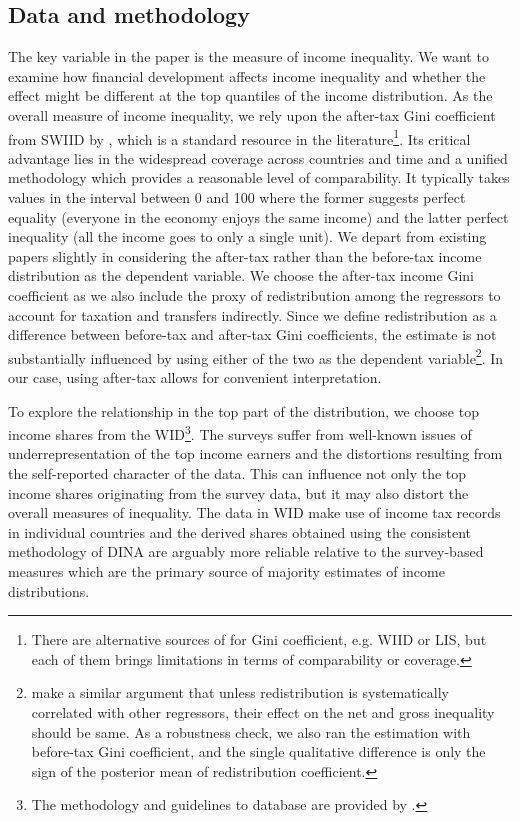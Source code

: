 \begin{refsection}
\section{Data and methodology}\label{ch4sec:datameth}
The key variable in the paper is the measure of income inequality. We want to examine how financial development affects income inequality and whether the effect might be different at the top quantiles of the income distribution. As the overall measure of income inequality, we rely upon the after-tax Gini coefficient from \ac{SWIID} by \textcite{Solt2019}, which is a standard resource in the literature\footnote{There are alternative sources of for Gini coefficient, e.g. \ac{WIID} or \ac{LIS}, but each of them brings limitations in terms of comparability or coverage.}. Its critical advantage lies in the widespread coverage across countries and time and a unified methodology which provides a reasonable level of comparability. It typically takes values in the interval between 0 and 100 where the former suggests perfect equality (everyone in the economy enjoys the same income) and the latter perfect inequality (all the income goes to only a single unit). We depart from existing papers slightly in considering the after-tax rather than the before-tax income distribution as the dependent variable. We choose the after-tax income Gini coefficient as we also include the proxy of redistribution among the regressors to account for taxation and transfers indirectly. Since we define redistribution as a difference between before-tax and after-tax Gini coefficients, the estimate is not substantially influenced by using either of the two as the dependent variable\footnote{\textcite{furceri2019robust} make a similar argument that unless redistribution is systematically correlated with other regressors, their effect on the net and gross inequality should be same. As a robustness check, we also ran the estimation with before-tax Gini coefficient, and the single qualitative difference is only the sign of the posterior mean of redistribution coefficient.}. In our case, using after-tax allows for convenient interpretation.

To explore the relationship in the top part of the distribution, we choose top income shares from the \ac{WID}\footnote{The methodology and guidelines to database are provided by \textcite{alvaredo2016distributional}.}. The surveys suffer from well-known issues of underrepresentation of the top income earners and the distortions resulting from the self-reported character of the data. This can influence not only the top income shares originating from the survey data, but it may also distort the overall measures of inequality. The data in \ac{WID} make use of income tax records in individual countries and the derived shares obtained using the consistent methodology of \ac{DINA} are arguably more reliable relative to the survey-based measures which are the primary source of majority estimates of income distributions. 


\end{refsection}
